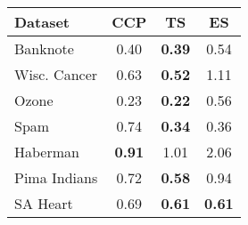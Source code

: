 \begin{tabular}{lccc}
\toprule
Dataset & CCP & TS & ES \\
\midrule
Banknote & 0.40 & \textbf{0.39} & 0.54 \\
Wisc. Cancer & 0.63 & \textbf{0.52} & 1.11 \\
Ozone & 0.23 & \textbf{0.22} & 0.56 \\
Spam & 0.74 & \textbf{0.34} & 0.36 \\
Haberman & \textbf{0.91} & 1.01 & 2.06 \\
Pima Indians & 0.72 & \textbf{0.58} & 0.94 \\
SA Heart & 0.69 & \textbf{0.61} & \textbf{0.61} \\
\bottomrule
\end{tabular}